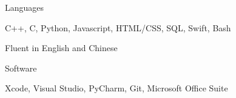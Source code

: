 \vspace{-3mm}

\begin{cventries}
    \cventry
    {}
    {Languages}
    {}
    {}
    {\begin{cvitems}
        \vspace*{-1mm}
        \item {C++, C, Python, Javascript, HTML/CSS, SQL, Swift, Bash}
        \item {Fluent in English and Chinese}
        \end{cvitems}
    }

    \cventry
    {}
    {Software}
    {}
    {}
    {\begin{cvitems}
        \vspace*{-4mm}
        \item {Xcode, Visual Studio, PyCharm, Git, Microsoft Office Suite}
    \end{cvitems}
    }
\end{cventries}
